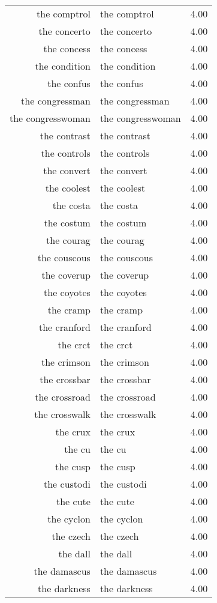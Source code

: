 \begin{table}[ht]
\begin{tabular}{rlr}
  the comptrol & the comptrol & 4.00 \\ 
  the concerto & the concerto & 4.00 \\ 
  the concess & the concess & 4.00 \\ 
  the condition & the condition & 4.00 \\ 
  the confus & the confus & 4.00 \\ 
  the congressman & the congressman & 4.00 \\ 
  the congresswoman & the congresswoman & 4.00 \\ 
  the contrast & the contrast & 4.00 \\ 
  the controls & the controls & 4.00 \\ 
  the convert & the convert & 4.00 \\ 
  the coolest & the coolest & 4.00 \\ 
  the costa & the costa & 4.00 \\ 
  the costum & the costum & 4.00 \\ 
  the courag & the courag & 4.00 \\ 
  the couscous & the couscous & 4.00 \\ 
  the coverup & the coverup & 4.00 \\ 
  the coyotes & the coyotes & 4.00 \\ 
  the cramp & the cramp & 4.00 \\ 
  the cranford & the cranford & 4.00 \\ 
  the crct & the crct & 4.00 \\ 
  the crimson & the crimson & 4.00 \\ 
  the crossbar & the crossbar & 4.00 \\ 
  the crossroad & the crossroad & 4.00 \\ 
  the crosswalk & the crosswalk & 4.00 \\ 
  the crux & the crux & 4.00 \\ 
  the cu & the cu & 4.00 \\ 
  the cusp & the cusp & 4.00 \\ 
  the custodi & the custodi & 4.00 \\ 
  the cute & the cute & 4.00 \\ 
  the cyclon & the cyclon & 4.00 \\ 
  the czech & the czech & 4.00 \\ 
  the dall & the dall & 4.00 \\ 
  the damascus & the damascus & 4.00 \\ 
  the darkness & the darkness & 4.00 \\ 

\end{tabular}
\end{table}

